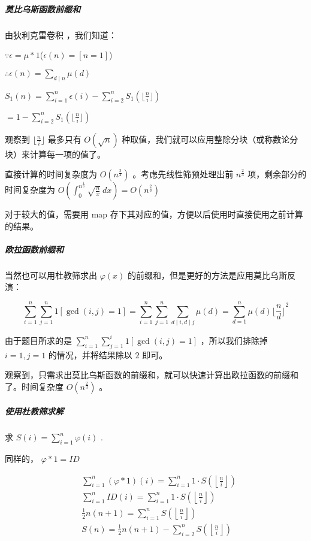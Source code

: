 \documentclass[UTF8]{ctexart}
\begin{document}
\subparagraph{莫比乌斯函数前缀和}

由狄利克雷卷积 ，我们知道：

$\because \epsilon =\mu \ast 1$($\epsilon(n)=[n=1]$)

$\therefore \epsilon (n)=\sum_{d \mid n} \mu(d)$

$S_1(n)=\sum_{i=1}^n \epsilon (i)-\sum_{i=2}^n S_1(\lfloor \frac n i \rfloor)$

$= 1-\sum_{i=2}^n S_1(\lfloor \frac n i \rfloor)$

观察到 $\lfloor \frac n i \rfloor$ 最多只有 $O(\sqrt n)$ 种取值，我们就可以应用整除分块（或称数论分块）来计算每一项的值了。

直接计算的时间复杂度为 $O(n^{\frac 3 4})$ 。考虑先线性筛预处理出前 $n^{\frac 2 3}$ 项，剩余部分的时间复杂度为 $O(\int_{0}^{n^{\frac 1 3}} \sqrt{\frac{n}{x}} ~ dx)=O(n^{\frac 2 3})$

对于较大的值，需要用 map 存下其对应的值，方便以后使用时直接使用之前计算的结果。

\subparagraph{欧拉函数前缀和}

当然也可以用杜教筛求出 $\varphi (x)$ 的前缀和，但是更好的方法是应用莫比乌斯反演：

$$\sum_{i=1}^n \sum_{j=1}^n 1[\gcd(i,j)=1]=\sum_{i=1}^n \sum_{j=1}^n \sum_{d \mid i,d \mid j} \mu(d)=\sum_{d=1}^n \mu(d) {\lfloor \frac n d \rfloor}^2$$

由于题目所求的是 $\sum_{i=1}^n \sum_{j=1}^i 1[\gcd(i,j)=1]$ ，所以我们排除掉 $i=1,j=1$ 的情况，并将结果除以 $2$ 即可。

观察到，只需求出莫比乌斯函数的前缀和，就可以快速计算出欧拉函数的前缀和了。时间复杂度 $O(n^{\frac 2 3})$ 。

\subparagraph{使用杜教筛求解}

求 $S(i)=\sum_{i=1}^n\varphi(i)$ .

同样的， $\varphi\ast 1=ID$

\begin{align*}
&\sum_{i=1}^n(\varphi\ast 1)(i) = \sum_{i=1}^n1\cdot S\left(\left\lfloor\frac{n}{i}\right\rfloor\right)\\
&\sum_{i=1}^nID(i) = \sum_{i=1}^n1\cdot S\left(\left\lfloor\frac{n}{i}\right\rfloor\right)\\
&\frac{1}{2}n(n+1)=\sum_{i=1}^nS\left(\left\lfloor\frac{n}{i}\right\rfloor\right)\\
&S(n) = \frac{1}{2}n(n+1)-\sum_{i=2}^nS\left(\left\lfloor\frac{n}{i}\right\rfloor\right)\ 
\end{align*}
\end{document}
